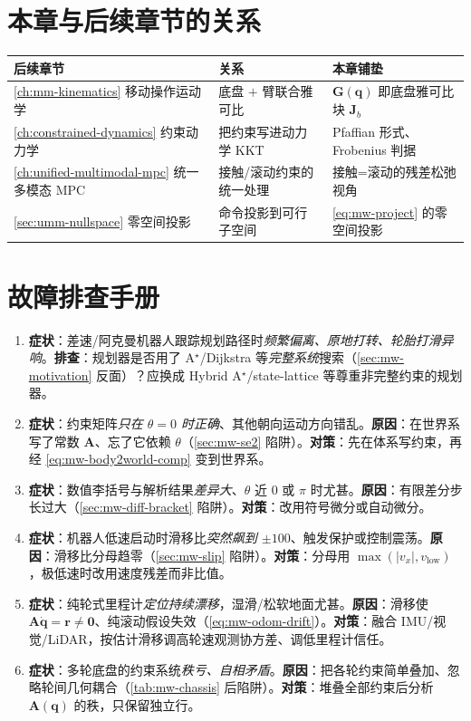 \section*{本章与后续章节的关系}
\begin{table}[H]\centering\small
\begin{tabular}{lll}
\toprule
后续章节 & 关系 & 本章铺垫 \\
\midrule
\cref{ch:mm-kinematics} 移动操作运动学 & 底盘 $+$ 臂联合雅可比 & $\mathbf{G}(\mathbf{q})$ 即底盘雅可比块 $\mathbf{J}_b$ \\
\cref{ch:constrained-dynamics} 约束动力学 & 把约束写进动力学 KKT & Pfaffian 形式、Frobenius 判据 \\
\cref{ch:unified-multimodal-mpc} 统一多模态 MPC & 接触/滚动约束的统一处理 & 接触=滚动的残差松弛视角 \\
\cref{sec:umm-nullspace} 零空间投影 & 命令投影到可行子空间 & \cref{eq:mw-project} 的零空间投影 \\
\bottomrule
\end{tabular}
\end{table}

\section*{故障排查手册}
\begin{enumerate}
  \item \textbf{症状}：差速/阿克曼机器人跟踪规划路径时\emph{频繁偏离、原地打转、轮胎打滑异响}。\textbf{排查}：规划器是否用了 A$^\star$/Dijkstra 等\emph{完整系统}搜索（\cref{sec:mw-motivation} 反面）？应换成 Hybrid A$^\star$/state-lattice 等尊重非完整约束的规划器。
  \item \textbf{症状}：约束矩阵\emph{只在 $\theta=0$ 时正确}、其他朝向运动方向错乱。\textbf{原因}：在世界系写了常数 $\mathbf{A}$、忘了它依赖 $\theta$（\cref{sec:mw-se2} 陷阱）。\textbf{对策}：先在体系写约束，再经 \cref{eq:mw-body2world-comp} 变到世界系。
  \item \textbf{症状}：数值李括号与解析结果\emph{差异大}、$\theta$ 近 $0$ 或 $\pi$ 时尤甚。\textbf{原因}：有限差分步长过大（\cref{sec:mw-diff-bracket} 陷阱）。\textbf{对策}：改用符号微分或自动微分。
  \item \textbf{症状}：机器人低速启动时滑移比\emph{突然飙到 $\pm100$}、触发保护或控制震荡。\textbf{原因}：滑移比分母趋零（\cref{sec:mw-slip} 陷阱）。\textbf{对策}：分母用 $\max(|v_x|,v_{\text{low}})$，极低速时改用速度残差而非比值。
  \item \textbf{症状}：纯轮式里程计\emph{定位持续漂移}，湿滑/松软地面尤甚。\textbf{原因}：滑移使 $\mathbf{A}\dot{\mathbf{q}}=\mathbf{r}\neq\mathbf{0}$、纯滚动假设失效（\cref{eq:mw-odom-drift}）。\textbf{对策}：融合 IMU/视觉/LiDAR，按估计滑移调高轮速观测协方差、调低里程计信任。
  \item \textbf{症状}：多轮底盘的约束系统\emph{秩亏、自相矛盾}。\textbf{原因}：把各轮约束简单叠加、忽略轮间几何耦合（\cref{tab:mw-chassis} 后陷阱）。\textbf{对策}：堆叠全部约束后分析 $\mathbf{A}(\mathbf{q})$ 的秩，只保留独立行。
\end{enumerate}
